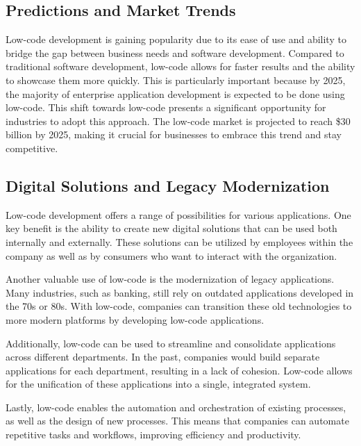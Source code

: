 \subsection{Predictions and Market
    Trends}\label{predictions-and-market-trends}

Low-code development is gaining popularity due to its ease of use and
ability to bridge the gap between business needs and software
development. Compared to traditional software development, low-code
allows for faster results and the ability to showcase them more quickly.
This is particularly important because by 2025, the majority of
enterprise application development is expected to be done using
low-code. This shift towards low-code presents a significant opportunity
for industries to adopt this approach. The low-code market is projected
to reach \$30 billion by 2025, making it crucial for businesses to
embrace this trend and stay competitive.

\subsection{Digital Solutions and Legacy
    Modernization}\label{digital-solutions-and-legacy-modernization}

Low-code development offers a range of possibilities for various
applications. One key benefit is the ability to create new digital
solutions that can be used both internally and externally. These
solutions can be utilized by employees within the company as well as by
consumers who want to interact with the organization.

Another valuable use of low-code is the modernization of legacy
applications. Many industries, such as banking, still rely on outdated
applications developed in the 70s or 80s. With low-code, companies can
transition these old technologies to more modern platforms by developing
low-code applications.

Additionally, low-code can be used to streamline and consolidate
applications across different departments. In the past, companies would
build separate applications for each department, resulting in a lack of
cohesion. Low-code allows for the unification of these applications into
a single, integrated system.

Lastly, low-code enables the automation and orchestration of existing
processes, as well as the design of new processes. This means that
companies can automate repetitive tasks and workflows, improving
efficiency and productivity.

